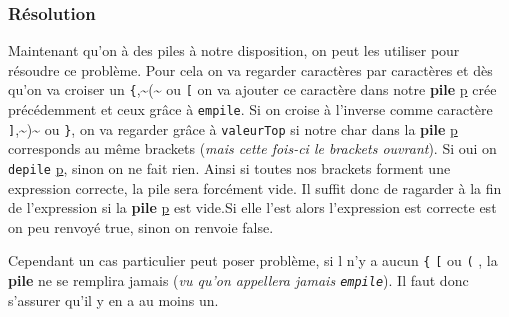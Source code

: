 \documentclass[11pt]{article}
\begin{document}
\subsubsection{Résolution}
\label{sec:org614d658}

    Maintenant qu'on à des piles à notre disposition, on peut les utiliser pour résoudre ce problème. Pour cela on va regarder caractères par caractères et dès qu'on va croiser un \texttt{\{},\textasciitilde{}(\textasciitilde{} ou \texttt{[} on va ajouter ce caractère dans notre \textbf{pile} \uline{p} crée précédemment et ceux grâce à \texttt{empile}. Si on croise à l'inverse comme caractère \texttt{]},\textasciitilde{})\textasciitilde{} ou \texttt{\}}, on va regarder grâce à \texttt{valeurTop} si notre char dans la \textbf{pile} \uline{p} corresponds au même brackets (\emph{mais cette fois-ci le brackets ouvrant}).
Si oui on \texttt{depile} \uline{p}, sinon on ne fait rien. Ainsi si toutes nos brackets forment une expression correcte, la pile sera forcément vide. Il suffit donc de ragarder à la fin de l'expression si la \textbf{pile} \uline{p} est vide.Si elle l'est alors l'expression est correcte est on peu renvoyé true, sinon on renvoie false. 

Cependant un cas particulier peut poser problème, si l n'y a aucun \texttt{\{} \texttt{[} ou \texttt{(} , la \textbf{pile} ne se remplira jamais (\emph{vu qu'on appellera jamais \texttt{empile}}). Il faut donc s'assurer qu'il y en a au moins un.
\end{document}
